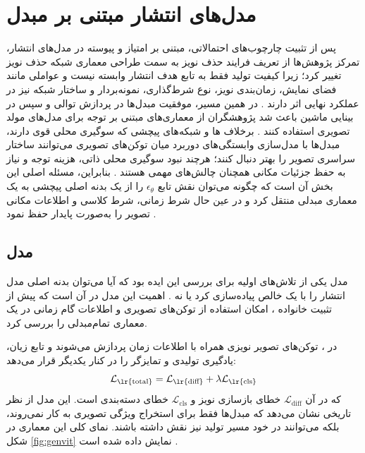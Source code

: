 \section{مدل‌های انتشار مبتنی بر مبدل}
پس از تثبیت چارچوب‌های احتمالاتی، مبتنی بر امتیاز و پیوسته در مدل‌های انتشار، تمرکز پژوهش‌ها از تعریف فرایند حذف نویز به سمت طراحی معماری شبکه حذف نویز تغییر کرد؛ زیرا کیفیت تولید فقط به تابع هدف انتشار وابسته نیست و عواملی مانند فضای نمایش، زمان‌بندی نویز، نوع شرط‌گذاری، نمونه‌بردار و ساختار شبکه نیز در عملکرد نهایی اثر دارند \cite{0214306,7811582,9851474}. در همین مسیر، موفقیت مبدل‌ها در پردازش توالی و سپس در بینایی ماشین باعث شد پژوهشگران از معماری‌های مبتنی بر توجه برای مدل‌های مولد تصویری استفاده کنند \cite{Vaswani2017,Dosovitskiy2020}. برخلاف ها و شبکه‌های پیچشی که سوگیری محلی قوی دارند، مبدل‌ها با مدل‌سازی وابستگی‌های دوربرد میان توکن‌های تصویری می‌توانند ساختار سراسری تصویر را بهتر دنبال کنند؛ هرچند نبود سوگیری محلی ذاتی، هزینه توجه و نیاز به حفظ جزئیات مکانی همچنان چالش‌های مهمی هستند \cite{0017415,3153255,9511279}. بنابراین، مسئله اصلی این بخش آن است که چگونه می‌توان نقش تابع $\epsilon_\theta$ را از یک بدنه اصلی پیچشی به یک معماری مبدلی منتقل کرد و در عین حال شرط زمانی، شرط کلاسی و اطلاعات مکانی تصویر را به‌صورت پایدار حفظ نمود \cite{2212.09748,5638143,8106348}.

\subsection{مدل }
مدل  یکی از تلاش‌های اولیه برای بررسی این ایده بود که آیا می‌توان بدنه اصلی مدل انتشار را با یک  خالص پیاده‌سازی کرد یا نه \cite{2208.07791}. اهمیت این مدل در آن است که پیش از تثبیت خانواده ، امکان استفاده از توکن‌های تصویری و اطلاعات گام زمانی در یک معماری تمام‌مبدلی را بررسی کرد.

در ، توکن‌های تصویر نویزی همراه با اطلاعات زمان پردازش می‌شوند و تابع زیان، یادگیری تولیدی و تمایزگر را در کنار یکدیگر قرار می‌دهد:
\begin{equation}
\mathcal{L}_{\text{\lr{total}}} = \mathcal{L}_{\text{\lr{diff}}} + \lambda \mathcal{L}_{\text{\lr{cls}}}
\end{equation}
که در آن $\mathcal{L}_{\text{diff}}$ خطای بازسازی نویز و $\mathcal{L}_{\text{cls}}$ خطای دسته‌بندی است. این مدل از نظر تاریخی نشان می‌دهد که مبدل‌ها فقط برای استخراج ویژگی تصویری به کار نمی‌روند، بلکه می‌توانند در خود مسیر تولید نیز نقش داشته باشند. نمای کلی این معماری در شکل \ref{fig:genvit} نمایش داده شده است \cite{2208.07791}.


